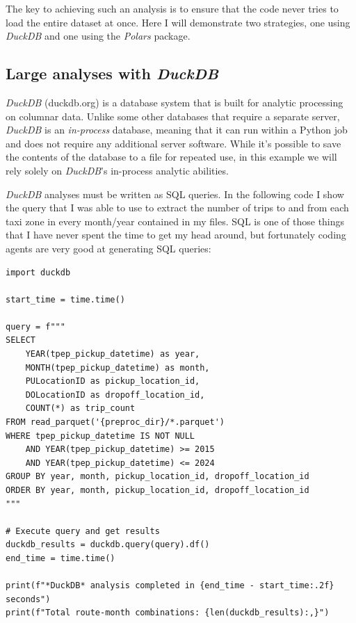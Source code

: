 The key to achieving such an analysis is to ensure that the code never tries to load the entire dataset at once.  Here I will demonstrate two strategies, one using \textit{DuckDB} and one using the \textit{Polars} package.

\subsection{Large analyses with \textit{DuckDB}}

\textit{DuckDB} (duckdb.org) is a database system that is built for analytic processing on columnar data. Unlike some other databases that require a separate server, \textit{DuckDB} is an \textit{in-process} database, meaning that it can run within a Python job and does not require any additional server software.  While it's possible to save the contents of the database to a file for repeated use, in this example we will rely solely on \textit{DuckDB}'s in-process analytic abilities.

\textit{DuckDB} analyses must be written as SQL queries. In the following code I show the query that I was able to use to extract the number of trips to and from each taxi zone in every month/year contained in my files.  SQL is one of those things that I have never spent the time to get my head around, but fortunately coding agents are very good at generating SQL queries:

\begin{lstlisting}[style=Python]
import duckdb

start_time = time.time()

query = f"""
SELECT 
    YEAR(tpep_pickup_datetime) as year,
    MONTH(tpep_pickup_datetime) as month,
    PULocationID as pickup_location_id,
    DOLocationID as dropoff_location_id,
    COUNT(*) as trip_count
FROM read_parquet('{preproc_dir}/*.parquet')
WHERE tpep_pickup_datetime IS NOT NULL
    AND YEAR(tpep_pickup_datetime) >= 2015
    AND YEAR(tpep_pickup_datetime) <= 2024
GROUP BY year, month, pickup_location_id, dropoff_location_id
ORDER BY year, month, pickup_location_id, dropoff_location_id
"""

# Execute query and get results
duckdb_results = duckdb.query(query).df()
end_time = time.time()

print(f"*DuckDB* analysis completed in {end_time - start_time:.2f} seconds")
print(f"Total route-month combinations: {len(duckdb_results):,}")
\end{lstlisting}

